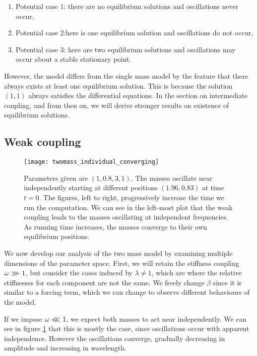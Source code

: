 \documentclass{article}
\begin{document}

\begin{enumerate}
    \item Potential case 1: there are no equilibrium solutions and oscillations never occur,
    \item Potential case 2:here is one equilibrium solution and oscillations do not occur,
    \item Potential case 3: here are two equilibrium solutions and oscillations may occur about a stable stationary point.
\end{enumerate}

However, the model differs from the single mass model by the feature that there always exists at least one equilibrium solution.
This is because the solution \((1,1)\) always satisfies the differential equations.
In the section on intermediate coupling, and from then on,
we will derive stronger results on existence of equilibrium solutions.


\subsection{Weak coupling}

\begin{figure}
    \centering
    \texttt{[image: twomass\_individual\_converging]}
    \caption{
        Parameters given are \((1, 0.8, 3, 1)\). The masses oscillate near independently starting at different positions $(1.96, 0.83)$ at time $t=0$.
        The figures, left to right, progressively increase the time we run the computation.
        We can see in the left-most plot that the weak coupling leads to the masses oscillating at independent frequencies.
        As running time increases, the masses converge to their own equilibrium positions.
        }
    \label{fig:twomass_independent}
\end{figure}
We now develop our analysis of the two mass model by examining multiple dimensions of the parameter space.
First, we will retain the stiffness coupling \(\omega \gggtr 1\),
but consider the cases induced by \(\lambda \ne 1\), which are where the relative stiffnesses for each component are not the same.
We freely change \(\beta\) since it is similar to a forcing term, which we can change to observe different behaviours of the model.

If we impose \(\omega \llless 1\), we expect both masses to act near independently.
We can see in figure \ref{fig:twomass_independent} that this is mostly the case, since oscillations occur with apparent independence.
However the oscillations converge, gradually decreasing in amplitude and increasing in wavelength.
\end{document}
